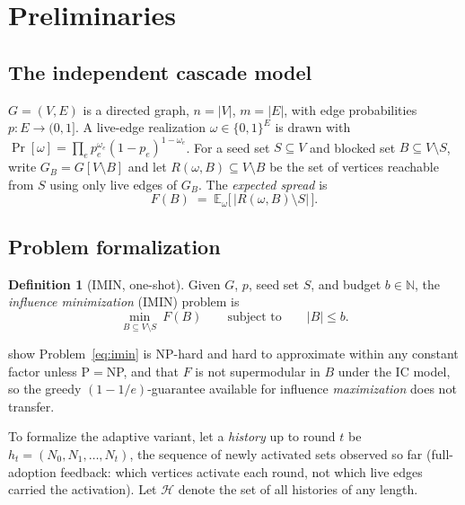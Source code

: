 \documentclass[11pt]{article}
\theoremstyle{definition}
\newtheorem{definition}{Definition}
\theoremstyle{remark}
\newcommand{\Rspread}{R}
\newcommand{\FF}{F}
\begin{document}
\section{Preliminaries}\label{sec:prelim}
\subsection{The independent cascade model}\label{sec:ic-model}

$G=(V,E)$ is a directed graph,
$n=|V|$, $m=|E|$, with edge probabilities $p:E\to(0,1]$. A live-edge
realization $\omega\in\{0,1\}^E$ is drawn with
$\Pr[\omega]=\prod_{e}p_e^{\omega_e}(1-p_e)^{1-\omega_e}$. For a seed set
$S\subseteq V$ and blocked set $B\subseteq V\setminus S$, write
$G_B=G[V\setminus B]$ and let $\Rspread(\omega,B)\subseteq V\setminus B$ be
the set of vertices reachable from $S$ using only live edges of $G_B$. The
\emph{expected spread} is
\begin{equation}\label{eq:spread}
\FF(B)\;=\;\mathbb E_\omega\bigl[\,|\Rspread(\omega,B)\setminus S|\,\bigr].
\end{equation}

\subsection{Problem formalization}\label{sec:formalization}

\begin{definition}[IMIN, one-shot]\label{def:imin}
Given $G$, $p$, seed set $S$, and budget $b\in\mathbb N$, the
\emph{influence minimization} (IMIN) problem is
\begin{equation}\label{eq:imin}
\min_{B\subseteq V\setminus S}\ \FF(B)
\qquad\text{subject to}\qquad
|B|\le b.
\end{equation}
\end{definition}

\noindent \citet{xie2023} show Problem~\eqref{eq:imin} is NP-hard and hard
to approximate within any constant factor unless P$=$NP, and that $\FF$ is
not supermodular in $B$ under the IC model, so the greedy
$(1-1/e)$-guarantee available for influence \emph{maximization}
\citep{kempe2003} does not transfer.

To formalize the adaptive variant, let a \emph{history} up to round $t$ be
$h_t=(N_0,N_1,\dots,N_t)$, the sequence of newly activated sets observed so
far (full-adoption feedback: which vertices activate each round, not which
live edges carried the activation). Let $\mathcal H$ denote the set of all
histories of any length.
\end{document}
